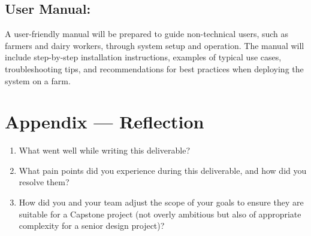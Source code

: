 \documentclass{article}
\begin{document}
    \subsection{User Manual:}
        A user-friendly manual will be prepared to guide non-technical users, such as farmers 
        and dairy workers, through system setup and operation. The manual will include step-by-step installation 
        instructions, examples of typical use cases, troubleshooting tips, and recommendations for best practices 
        when deploying the system on a farm.





\newpage{}

\section*{Appendix --- Reflection}




\begin{enumerate}
    \item What went well while writing this deliverable? 
    \item What pain points did you experience during this deliverable, and how
    did you resolve them?
    \item How did you and your team adjust the scope of your goals to ensure
    they are suitable for a Capstone project (not overly ambitious but also of
    appropriate complexity for a senior design project)?
\end{enumerate}  
\end{document}
